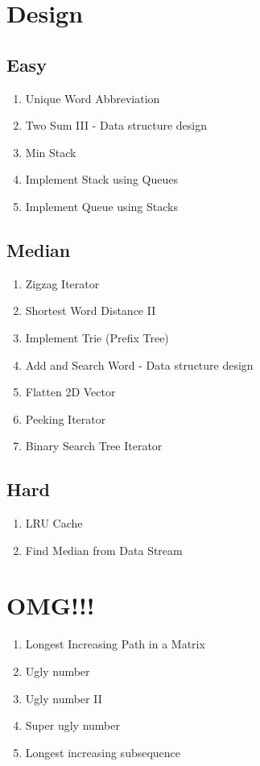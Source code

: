 \documentclass[DIV=calc, paper=a4, fontsize=11pt, twocolumn]{scrartcl}	 %
\begin{document}

\section*{Design}

\subsection*{Easy}
\begin{enumerate}
\item Unique Word Abbreviation \cite{288}
\item Two Sum III - Data structure design \cite{170}
\item Min Stack  \cite{155}
\item Implement Stack using Queues \cite{225}
\item Implement Queue using Stacks \cite{232}
\end{enumerate}

\subsection*{Median}
\begin{enumerate}
\item Zigzag Iterator \cite{281}
\item Shortest Word Distance II \cite{244}
\item Implement Trie (Prefix Tree) \cite{288}
\item Add and Search Word - Data structure design \cite{211}
\item Flatten 2D Vector \cite{251}
\item Peeking Iterator \cite{284}
\item Binary Search Tree Iterator \cite{173}
\end{enumerate}

\subsection*{Hard}
\begin{enumerate}
\item LRU Cache \cite{146}
\item Find Median from Data Stream \cite{295}
\end{enumerate}


\section*{OMG!!!}
\begin{enumerate}
\item Longest Increasing Path in a Matrix
\item Ugly number
\item Ugly number II
\item Super ugly number
\item Longest increasing subsequence
\end{enumerate}
\end{document}
